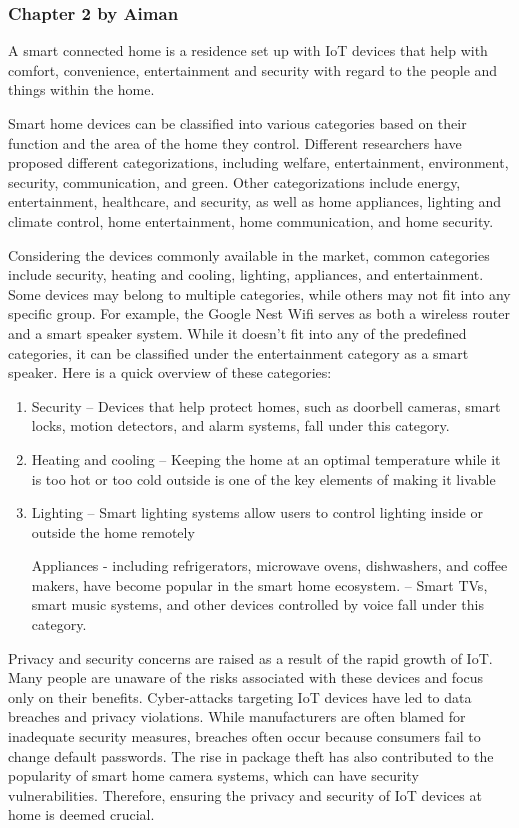 \subsubsection{Chapter 2 by Aiman}

A smart connected home is a residence set up with IoT devices that help with comfort, convenience, entertainment and security with regard to the people and things within the home.

Smart home devices can be classified into various categories based on their function and the area of the home they control. Different researchers have proposed different categorizations, including welfare, entertainment, environment, security, communication, and green. Other categorizations include energy, entertainment, healthcare, and security, as well as home appliances, lighting and climate control, home entertainment, home communication, and home security.

Considering the devices commonly available in the market, common categories include security, heating and cooling, lighting, appliances, and entertainment. Some devices may belong to multiple categories, while others may not fit into any specific group. For example, the Google Nest Wifi serves as both a wireless router and a smart speaker system. While it doesn't fit into any of the predefined categories, it can be classified under the entertainment category as a smart speaker.
Here is a quick overview of these categories:
\begin{enumerate}
    \item Security – Devices that help protect homes, such as doorbell cameras, smart locks, motion detectors, and alarm systems, fall under this category.
    \item Heating and cooling – Keeping the home at an optimal temperature while it is too hot or too cold outside is one of the key elements of making it livable
    \item Lighting – Smart lighting systems allow users to control lighting inside or outside the home remotely
    
    \Smart Appliances - including refrigerators, microwave ovens, dishwashers, and coffee makers, have become popular in the smart home ecosystem.
    \Entertainment – Smart TVs, smart music systems, and other devices controlled by voice fall under this category.
\end{enumerate}

Privacy and security concerns are raised as a result of the rapid growth of IoT. Many people are unaware of the risks associated with these devices and focus only on their benefits. Cyber-attacks targeting IoT devices have led to data breaches and privacy violations. While manufacturers are often blamed for inadequate security measures, breaches often occur because consumers fail to change default passwords. The rise in package theft has also contributed to the popularity of smart home camera systems, which can have security vulnerabilities.
Therefore, ensuring the privacy and security of IoT devices at home is deemed crucial.

